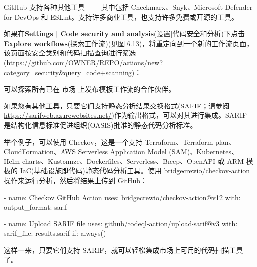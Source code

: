 
GitHub 支持各种其他工具—— 其中包括 Checkmarx、Snyk、Microsoft Defender for DevOps 和 ESLint。支持许多商业工具，也支持许多免费或开源的工具。

如果在\textbf{Settings | Code security and analysis}(设置|代码安全和分析)下点击\textbf{Explore workflows}(探索工作流)(见图 6.13)，将重定向到一个新的工作流页面，该页面按安全类别和代码扫描查询进行筛选(\url{https://github.com/OWNER/REPO/actions/new?category=security&query=code+scanning})：


可以探索所有已在 市场 上发布模板工作流的合作伙伴。

如果您有其他工具，只要它们支持静态分析结果交换格式(SARIF；请参阅 \url{https://sarifweb.azurewebsites.net/})作为输出格式，可以对其进行集成。SARIF 是结构化信息标准促进组织(OASIS)批准的静态代码分析标准。

举个例子，可以使用 Checkov，这是一个支持 Terraform、Terraform plan、CloudFormation、AWS Serverless Application Model (SAM)、Kubernetes、Helm charts、Kustomize、Dockerfiles、Serverless、Bicep、OpenAPI 或 ARM 模板的 IaC(基础设施即代码)静态代码分析工具。使用 bridgecrewio/checkov-action 操作来运行分析，然后将结果上传到 GitHub：

\begin{shell}
- name: Checkov GitHub Action
  uses: bridgecrewio/checkov-action@v12
  with:
    output_format: sarif

- name: Upload SARIF file
  uses: github/codeql-action/upload-sarif@v3
  with:
    sarif_file: results.sarif
  if: always()
\end{shell}

这样一来，只要它们支持 SARIF，就可以轻松集成市场上可用的代码扫描工具了。












